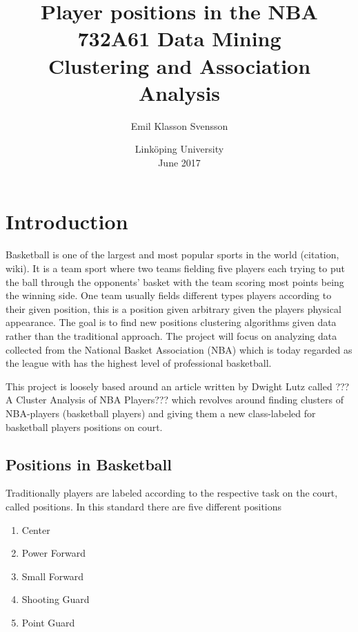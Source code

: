 \documentclass{article}
\title{Player positions in the NBA \\
\large  732A61 Data Mining \\
 Clustering and Association Analysis }
\author{Emil Klasson Svensson }
\date{Linköping University \\
June 2017}
\begin{document}
\maketitle

\newpage

\section{Introduction}

Basketball is one of the largest and most popular sports in the world (citation, wiki). It is a team sport where two teams fielding five players each trying to put the ball through the opponents’ basket with the team scoring most points being the winning side. One team usually fields different types players according to their given position, this is a position given arbitrary given the players physical appearance. The goal is to find new positions clustering algorithms given data rather than the traditional approach. The project will focus on analyzing data collected from the National Basket Association (NBA) which is today regarded as the league with has the highest level of professional basketball.


This project is loosely based around an article written by Dwight Lutz called ???A Cluster Analysis of NBA Players??? which revolves around finding clusters of NBA-players (basketball players) and giving them a new class-labeled for basketball players positions on court.
 



\subsection{Positions in Basketball}

Traditionally players are labeled according to the respective task on the court, called positions. In this standard there are five different positions

\begin{enumerate}
\item Center 
\item Power Forward
\item Small Forward
\item Shooting Guard
\item Point Guard
\end{enumerate}
\end{document}
